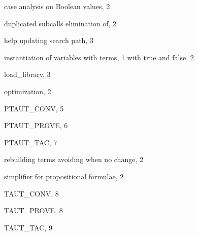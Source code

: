 \begin{theindex}

  \item case analysis
    \subitem on Boolean values, 2

  \indexspace

  \item duplicated subcalls
    \subitem elimination of, 2

  \indexspace

  \item help
    \subitem updating search path, 3

  \indexspace

  \item instantiation of variables
    \subitem with terms, 1
    \subitem with true and false, 2

  \indexspace

  \item {\ptt load\_library}, 3

  \indexspace

  \item optimization, 2

  \indexspace

  \item {\ptt PTAUT\_CONV}, 5
  \item {\ptt PTAUT\_PROVE}, 6
  \item {\ptt PTAUT\_TAC}, 7

  \indexspace

  \item rebuilding terms
    \subitem avoiding when no change, 2

  \indexspace

  \item simplifier
    \subitem for propositional formulae, 2

  \indexspace

  \item {\ptt TAUT\_CONV}, 8
  \item {\ptt TAUT\_PROVE}, 8
  \item {\ptt TAUT\_TAC}, 9

\end{theindex}
